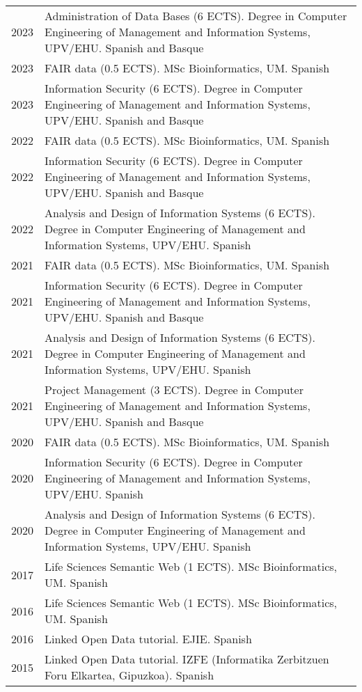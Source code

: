 \documentclass[11pt,fullpage]{article}
\begin{document}
\begin{longtable}{p{0.5in}|p{5.5in}}
2023 & Administration of Data Bases (6 ECTS). Degree in Computer Engineering of Management and Information Systems, UPV/EHU. Spanish and Basque \\
2023 & FAIR data (0.5 ECTS). MSc Bioinformatics, UM. Spanish \\
2023 & Information Security (6 ECTS). Degree in Computer Engineering of Management and Information Systems, UPV/EHU. Spanish and Basque \\
2022 & FAIR data (0.5 ECTS). MSc Bioinformatics, UM. Spanish \\
2022 & Information Security (6 ECTS). Degree in Computer Engineering of Management and Information Systems, UPV/EHU. Spanish and Basque \\
2022 & Analysis and Design of Information Systems (6 ECTS). Degree in Computer Engineering of Management and Information Systems, UPV/EHU. Spanish \\  
2021 & FAIR data (0.5 ECTS). MSc Bioinformatics, UM. Spanish \\
2021 & Information Security (6 ECTS). Degree in Computer Engineering of Management and Information Systems, UPV/EHU. Spanish and Basque \\
2021 & Analysis and Design of Information Systems (6 ECTS). Degree in Computer Engineering of Management and Information Systems, UPV/EHU. Spanish \\
2021 & Project Management (3 ECTS). Degree in Computer Engineering of Management and Information Systems, UPV/EHU. Spanish and Basque \\
2020 & FAIR data (0.5 ECTS). MSc Bioinformatics, UM. Spanish \\
2020 & Information Security (6 ECTS). Degree in Computer Engineering of Management and Information Systems, UPV/EHU. Spanish \\
2020 & Analysis and Design of Information Systems (6 ECTS). Degree in Computer Engineering of Management and Information Systems, UPV/EHU. Spanish \\
2017 & Life Sciences Semantic Web (1 ECTS). MSc Bioinformatics, UM. Spanish \\
2016 & Life Sciences Semantic Web (1 ECTS). MSc Bioinformatics, UM. Spanish \\
2016 & Linked Open Data tutorial. EJIE. Spanish \\
2015 & Linked Open Data tutorial. IZFE (Informatika Zerbitzuen Foru Elkartea, Gipuzkoa). Spanish \\

\end{longtable}
\end{document}
